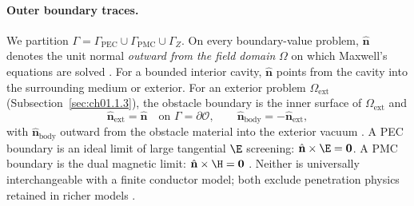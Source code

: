 \paragraph{Outer boundary traces.}
We partition $\Gamma=\Gamma_{\mathrm{PEC}}\cup\Gamma_{\mathrm{PMC}}\cup\Gamma_Z$. On every boundary-value problem, $\hat{\mathbf{n}}$ denotes the unit normal \emph{outward from the field domain} $\Omega$ on which Maxwell's equations are solved \cite{stratton1941}. For a bounded interior cavity, $\hat{\mathbf{n}}$ points from the cavity into the surrounding medium or exterior. For an exterior problem $\Omega_{\mathrm{ext}}$ (Subsection~\ref{sec:ch01.1.3}), the obstacle boundary is the inner surface of $\Omega_{\mathrm{ext}}$ and
\begin{equation}
\label{eq:ch1.exterior-normal-convention}
\hat{\mathbf{n}}_{\mathrm{ext}}=\hat{\mathbf{n}}\quad\text{on }\Gamma=\partial\mathcal{O},\qquad
\hat{\mathbf{n}}_{\mathrm{body}}=-\hat{\mathbf{n}}_{\mathrm{ext}},
\end{equation}
with $\hat{\mathbf{n}}_{\mathrm{body}}$ outward from the obstacle material into the exterior vacuum \cite{stratton1941,harrington2001}. A PEC boundary is an ideal limit of large tangential $\E$ screening: $\hat{\mathbf{n}}\times\E=\mathbf{0}$. A PMC boundary is the dual magnetic limit: $\hat{\mathbf{n}}\times\H=\mathbf{0}$ \cite{stratton1941}. Neither is universally interchangeable with a finite conductor model; both exclude penetration physics retained in richer models \cite{stratton1941}.

